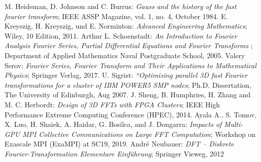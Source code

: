  M. Heideman, D. Johnson and C. Burrus: {\sl Gauss and the history of the fast fourier transform}; IEEE ASSP Magazine, vol. 1, no. 4, October 1984.
 E. Kreyszig, H. Kreyszig, und E. Norminton: {\sl Advanced Engineering Mathematics}; Wiley, 10 Edition, 2011.
 Arthur L. Schoenstadt: {\sl An Introduction to Fourier Analysis Fourier Series, Partial Diﬀerential Equations
and Fourier Transforms
}; Department of Applied Mathematics Naval Postgraduate School, 2005.
 Valery Serov: {\sl Fourier Series, Fourier Transform and Their Applications to Mathematical Physics}; Springer Verlag, 2017.
 U. Sigrist: {\sl “Optimizing parallel 3D fast Fourier transformations for a
cluster of IBM POWER5 SMP nodes}; Ph.D. Dissertation, The University of Edinburgh, Aug 2007.
J. Sheng, B. Humphries, H. Zhang and M. C. Herbordt: {\sl Design of 3D FFTs with FPGA Clusters}; IEEE High Performance Extreme Computing Conference (HPEC), 2014.
 Ayala A., S. Tomov, X. Luo, H. Shaiek, A. Haidar, G. Bosilca, and J. Dongarra: {\sl Impacts of Multi-GPU MPI Collective Communications on Large FFT Computation}; Workshop on Exascale MPI (ExaMPI) at SC19, 2019.
André Neubauer: {\sl DFT – Diskrete Fourier-Transformation Elementare Einführung}; Springer Vieweg, 2012
